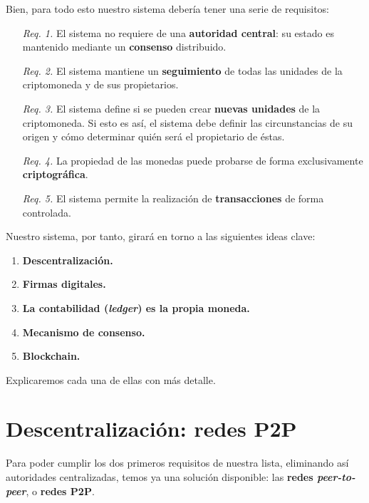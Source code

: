 \documentclass[10pt, a4paper]{article}
\theoremstyle{theorem-style}
\theoremstyle{theorem-style}
\theoremstyle{definition-style}
\theoremstyle{remark-style}
\theoremstyle{example-style}
\theoremstyle{definition-style}
\theoremstyle{remark-style}
\begin{document}
Bien, para todo esto nuestro sistema debería tener una serie de
requisitos:

\begin{enumerate}
\def\labelenumi{\arabic{enumi}.}
\itemsep1pt\parskip0pt
\item[\emph{Req. 1.}]
  El sistema no requiere de una \textbf{autoridad central}: su estado es
  mantenido mediante un \textbf{consenso} distribuido.
\item[\emph{Req. 2.}]
  El sistema mantiene un \textbf{seguimiento} de todas las unidades de
  la criptomoneda y de sus propietarios.
\item[\emph{Req. 3.}]
  El sistema define si se pueden crear \textbf{nuevas unidades} de la
  criptomoneda. Si esto es así, el sistema debe definir las
  circunstancias de su origen y cómo determinar quién será el
  propietario de éstas.
\item[\emph{Req. 4.}]
  La propiedad de las monedas puede probarse de forma exclusivamente
  \textbf{criptográfica}.
\item[\emph{Req. 5.}]
  El sistema permite la realización de \textbf{transacciones} de forma
  controlada.
\end{enumerate}

Nuestro sistema, por tanto, girará en torno a las siguientes ideas clave:

\begin{enumerate}
\itemsep1pt\parskip0pt
\item
  \textbf{Descentralización.}
\item
  \textbf{Firmas digitales.}
\item
  \textbf{La contabilidad (\emph{ledger}) es la propia moneda.}
\item
  \textbf{Mecanismo de consenso.}
\item
  \textbf{Blockchain.}
\end{enumerate}

Explicaremos cada una de ellas con más detalle.

\section{Descentralización: redes
P2P}\label{compartiendo-informaciuxf3n-de-forma-descentralizada-redes-p2p}

Para poder cumplir los dos primeros requisitos de nuestra lista,
eliminando así autoridades centralizadas, temos ya una solución
disponible: las \textbf{redes \emph{peer-to-peer}}, o \textbf{redes
P2P}.
\end{document}
